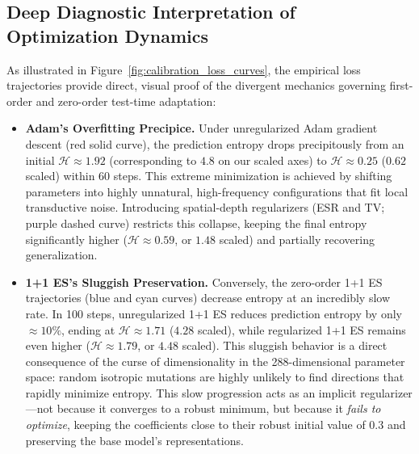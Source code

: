 \documentclass{article}
\theoremstyle{plain}
\theoremstyle{definition}
\theoremstyle{remark}
\begin{document}
\subsection{Deep Diagnostic Interpretation of Optimization Dynamics}
As illustrated in Figure~\ref{fig:calibration_loss_curves}, the empirical loss trajectories provide direct, visual proof of the divergent mechanics governing first-order and zero-order test-time adaptation:
\begin{itemize}
    \item \textbf{Adam's Overfitting Precipice.} Under unregularized Adam gradient descent (red solid curve), the prediction entropy drops precipitously from an initial $\mathcal{H} \approx 1.92$ (corresponding to $4.8$ on our scaled axes) to $\mathcal{H} \approx 0.25$ ($0.62$ scaled) within 60 steps. This extreme minimization is achieved by shifting parameters into highly unnatural, high-frequency configurations that fit local transductive noise. Introducing spatial-depth regularizers (ESR and TV; purple dashed curve) restricts this collapse, keeping the final entropy significantly higher ($\mathcal{H} \approx 0.59$, or $1.48$ scaled) and partially recovering generalization.
    \item \textbf{1+1 ES's Sluggish Preservation.} Conversely, the zero-order 1+1 ES trajectories (blue and cyan curves) decrease entropy at an incredibly slow rate. In 100 steps, unregularized 1+1 ES reduces prediction entropy by only $\approx 10\%$, ending at $\mathcal{H} \approx 1.71$ ($4.28$ scaled), while regularized 1+1 ES remains even higher ($\mathcal{H} \approx 1.79$, or $4.48$ scaled). This sluggish behavior is a direct consequence of the curse of dimensionality in the 288-dimensional parameter space: random isotropic mutations are highly unlikely to find directions that rapidly minimize entropy. This slow progression acts as an implicit regularizer---not because it converges to a robust minimum, but because it \emph{fails to optimize}, keeping the coefficients close to their robust initial value of $0.3$ and preserving the base model's representations.
\end{itemize}
\end{document}

